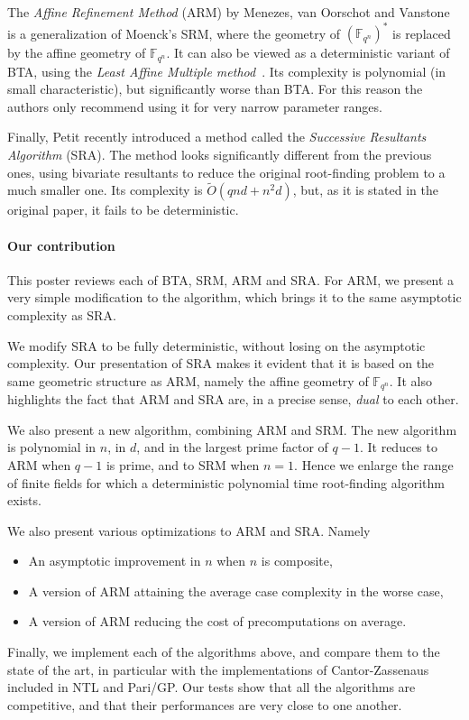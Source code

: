 \documentclass[12pt]{article}
\newcommand{\ff}[1]{\mathbb{F}_{#1}}
\newcommand{\qq}{q}
\newcommand{\nn}{n}
\newcommand{\qn}{{\qq^\nn}}
\newcommand{\extf}{\ff{\qn}}
\newcommand{\bigOt}{\tilde{O}}
\newcounter{algo}
\begin{document}
The \emph{Affine Refinement Method} (ARM) by Menezes, van Oorschot and
Vanstone~\cite{MenezesOV88,OorschotV89,Menvanovans92} is a
generalization of Moenck's SRM, where the geometry of $(\extf)^\ast$
is replaced by the affine geometry of $\extf$. It can also be viewed
as a deterministic variant of BTA, using the \emph{Least Affine
  Multiple method}~\cite{mBER84a}. Its complexity is polynomial (in
small characteristic), but significantly worse than BTA. For this
reason the authors only recommend using it for very narrow parameter
ranges.

Finally, Petit\cite{cgUCL-P14} recently introduced a method called the
\emph{Successive Resultants Algorithm} (SRA). The method looks
significantly different from the previous ones, using bivariate
resultants to reduce the original root-finding problem to a much
smaller one. Its complexity is $\bigOt(qnd+n^2d)$, but, as it is
stated in the original paper, it fails to be deterministic.


\paragraph{Our contribution} This poster reviews each of BTA, SRM, ARM
and SRA.  For ARM, we present a very simple modification to the
algorithm, which brings it to the same asymptotic complexity as SRA.

We modify SRA to be fully deterministic, without losing on the
asymptotic complexity. Our presentation of SRA makes it evident that
it is based on the same geometric structure as ARM, namely the affine
geometry of $\extf$. It also highlights the fact that ARM and SRA are,
in a precise sense, \emph{dual} to each other.

We also present a new algorithm, combining ARM and SRM. The new
algorithm is polynomial in $n$, in $d$, and in the largest prime
factor of $q-1$. It reduces to ARM when $q-1$ is prime, and to SRM
when $n=1$. Hence we enlarge the range of finite fields for which a
deterministic polynomial time root-finding algorithm exists.

We also present various optimizations to ARM and SRA. Namely
\begin{itemize}
\item An asymptotic improvement in $n$ when $n$ is composite,
\item A version of ARM attaining the average case complexity in the
  worse case,
\item A version of ARM reducing the cost of precomputations on
  average.
\end{itemize}

Finally, we implement each of the algorithms above, and compare them
to the state of the art, in particular with the implementations of
Cantor-Zassenaus included in NTL and Pari/GP. Our tests show that all
the algorithms are competitive, and that their performances are very
close to one another.




\end{document}
